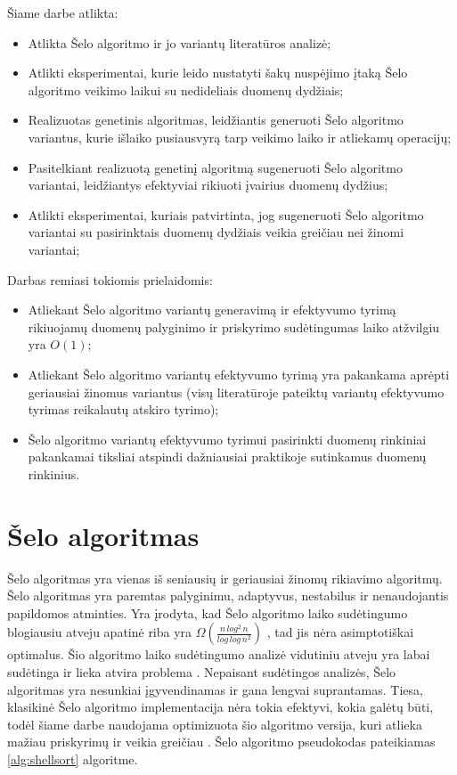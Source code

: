 \documentclass{VUMIFInfBakalaurinis}
\begin{document}
\medskip

Šiame darbe atlikta:
\begin{itemize}
    \item Atlikta Šelo algoritmo ir jo variantų literatūros analizė;
    \item Atlikti eksperimentai, kurie leido nustatyti šakų nuspėjimo įtaką Šelo algoritmo veikimo laikui su nedideliais duomenų dydžiais;
    \item Realizuotas genetinis algoritmas, leidžiantis generuoti Šelo algoritmo variantus, kurie išlaiko pusiausvyrą tarp veikimo laiko ir atliekamų operacijų;
    \item Pasitelkiant realizuotą genetinį algoritmą sugeneruoti Šelo algoritmo variantai, leidžiantys efektyviai rikiuoti įvairius duomenų dydžius;
    \item Atlikti eksperimentai, kuriais patvirtinta, jog sugeneruoti Šelo algoritmo variantai su pasirinktais duomenų dydžiais veikia greičiau nei žinomi variantai;
\end{itemize}

\medskip

Darbas remiasi tokiomis prielaidomis:
\begin{itemize}
    \item Atliekant Šelo algoritmo variantų generavimą ir efektyvumo tyrimą rikiuojamų duomenų palyginimo ir priskyrimo sudėtingumas laiko atžvilgiu yra $O(1)$;
    \item Atliekant Šelo algoritmo variantų efektyvumo tyrimą yra pakankama aprėpti geriausiai žinomus variantus
        (visų literatūroje pateiktų variantų efektyvumo tyrimas reikalautų atskiro tyrimo);
    \item Šelo algoritmo variantų efektyvumo tyrimui pasirinkti duomenų rinkiniai pakankamai tiksliai atspindi dažniausiai praktikoje sutinkamus duomenų rinkinius.
\end{itemize}


\section{Šelo algoritmas}

Šelo algoritmas yra vienas iš seniausių ir geriausiai žinomų rikiavimo algoritmų.
Šelo algoritmas yra paremtas palyginimu, adaptyvus, nestabilus ir nenaudojantis papildomos atminties.
Yra įrodyta, kad Šelo algoritmo laiko sudėtingumo blogiausiu atveju apatinė riba yra
$\Omega(\frac{n\,log^2\,n}{log\,log\,n^2})$ \cite{plaxton1992}, tad jis nėra asimptotiškai optimalus.
Šio algoritmo laiko sudėtingumo analizė vidutiniu atveju yra labai sudėtinga
ir lieka atvira problema \cite{ciura2001best,Radavičius_Baranauskas_2013}.
Nepaisant sudėtingos analizės, Šelo algoritmas yra nesunkiai įgyvendinamas ir gana lengvai suprantamas.
Tiesa, klasikinė Šelo algoritmo implementacija nėra tokia efektyvi, kokia galėtų būti, todėl šiame darbe naudojama
optimizuota šio algoritmo versija, kuri atlieka mažiau priskyrimų ir veikia greičiau \cite{Radavičius_Baranauskas_2013}.
Šelo algoritmo pseudokodas pateikiamas \ref{alg:shellsort} algoritme.
\end{document}
